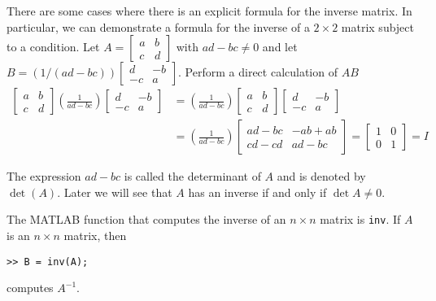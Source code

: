 \documentclass[../main.tex]{subfiles}
\begin{document}
There are some cases where there is an explicit formula for the inverse matrix. In particular, we can demonstrate a formula for the inverse of a $2 \times 2$ matrix subject to a condition. Let $A=\left[\begin{array}{ll}a & b \\ c & d\end{array}\right]$ with $a d-b c \neq 0$ and let $B=(1 /(a d-b c))\left[\begin{array}{cc}d & -b \\ -c & a\end{array}\right] .$ Perform a direct calculation of $A B$
$$
\begin{aligned}
\left[\begin{array}{ll}
a & b \\
c & d
\end{array}\right]\left(\frac{1}{a d-b c}\right)\left[\begin{array}{cc}
d & -b \\
-c & a
\end{array}\right] &=\left(\frac{1}{a d-b c}\right)\left[\begin{array}{ll}
a & b \\
c & d
\end{array}\right]\left[\begin{array}{cc}
d & -b \\
-c & a
\end{array}\right] \\
&=\left(\frac{1}{a d-b c}\right)\left[\begin{array}{ll}
a d-b c & -a b+a b \\
c d-c d & a d-b c
\end{array}\right]=\left[\begin{array}{ll}
1 & 0 \\
0 & 1
\end{array}\right]=I
\end{aligned}
$$

\begin{remark}
	The expression $a d-b c$ is called the determinant of $A$ and is denoted by $\operatorname{det}(A)$. Later we will see that $A$ has an inverse if and only if $\operatorname{det} A \neq 0$.
\end{remark}

The MATLAB function that computes the inverse of an $n \times n$ matrix is  \texttt{inv}. If $A$ is an $n \times n$ matrix, then
\begin{lstlisting}[numbers=none,frame=none]
	>> B = inv(A);
\end{lstlisting}
computes $A^{-1}$.
\end{document}
